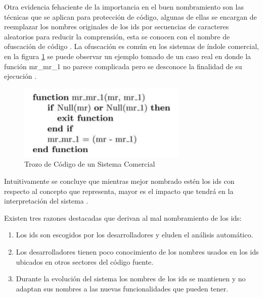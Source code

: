 \documentclass[12pt]{report}
\begin{document}

Otra evidencia fehaciente de la importancia en el buen nombramiento son las técnicas que se aplican para protección de código, algunas de ellas se encargan de reemplazar los nombres originales de los ids por secuencias de caracteres aleatorios 
para reducir la comprensión, esta se conocen con el nombre de ofuscación de código \cite{DFPM05}. La ofuscación es común en los sistemas de índole comercial, en la figura \ref{captura2} se puede observar un ejemplo tomado de un caso real en donde la función \textsf{mr\_mr\_1} no parece complicada pero se desconoce la finalidad de su ejecución \cite{DFPM05}.

\begin{figure}[h] %
\centering
\includegraphics[scale= 0.50]{./idd_1.png}
\caption{Trozo de Código de un Sistema Comercial}
\label{captura2}
\end{figure} 


Intuitivamente se concluye 	que mientras mejor nombrado estén los ids con respecto al concepto que representa, mayor es el impacto que tendrá en la interpretación del sistema \cite{DFPM05}. 

Existen tres razones destacadas que derivan al mal nombramiento de los ids:

\begin{enumerate}
\itemsep0em%
\item Los ids son escogidos por los desarrolladores y eluden el análisis automático.

\item Los desarrolladores tienen poco conocimiento de los nombres usados en los ids ubicados en otros sectores del código fuente.

\item Durante la evolución del sistema los nombres de los ids se mantienen y no adaptan sus nombres a las nuevas funcionalidades que pueden tener.
\end{enumerate}
\end{document}
